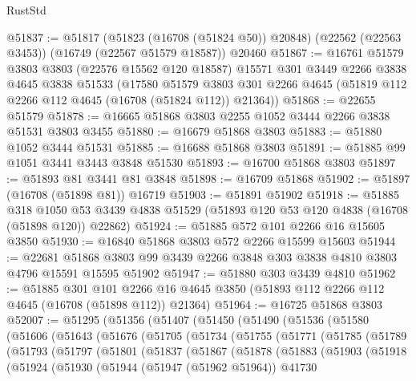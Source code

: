 \begin{lexlean}{RustStd}
\begin{coremodule}
@51837 := @51817
    (@51823 (@16708 (@51824 @50)) @20848)
    (@22562 (@22563 @3453))
    (@16749 (@22567 @51579 @18587))
    @20460
@51867 := @16761
    @51579
    @3803
    @3803
    (@22576 @15562 @120 @18587)
    @15571
    @301
    @3449
    @2266
    @3838
    @4645
    @3838
    @51533
    (@17580
      @51579
      @3803
      @301
      @2266
      @4645
      (@51819 @112 @2266 @112 @4645 (@16708 (@51824 @112)) @21364))
@51868 := @22655 @51579
@51878 := @16665 @51868 @3803 @2255 @1052 @3444 @2266 @3838 @51531 @3803 @3455
@51880 := @16679 @51868 @3803
@51883 := @51880 @1052 @3444 @51531
@51885 := @16688 @51868 @3803
@51891 := @51885 @99 @1051 @3441 @3443 @3848 @51530
@51893 := @16700 @51868 @3803
@51897 := @51893 @81 @3441 @81 @3848
@51898 := @16709 @51868
@51902 := @51897 (@16708 (@51898 @81)) @16719
@51903 := @51891 @51902
@51918 := @51885
    @318
    @1050
    @53
    @3439
    @4838
    @51529
    (@51893 @120 @53 @120 @4838 (@16708 (@51898 @120)) @22862)
@51924 := @51885 @572 @101 @2266 @16 @15605 @3850
@51930 := @16840 @51868 @3803 @572 @2266 @15599 @15603
@51944 := @22681
    @51868
    @3803
    @99
    @3439
    @2266
    @3848
    @303
    @3838
    @4810
    @3803
    @4796
    @15591
    @15595
    @51902
@51947 := @51880 @303 @3439 @4810
@51962 := @51885
    @301
    @101
    @2266
    @16
    @4645
    @3850
    (@51893 @112 @2266 @112 @4645 (@16708 (@51898 @112)) @21364)
@51964 := @16725 @51868 @3803
@52007 := @51295
    (@51356
      (@51407
        (@51450
          (@51490
            (@51536
              (@51580
                (@51606
                  (@51643
                    (@51676
                      (@51705
                        (@51734
                          (@51755
                            (@51771
                              (@51785
                                (@51789
                                  (@51793
                                    (@51797
                                      (@51801
                                        (@51837
                                          (@51867
                                            (@51878
                                              (@51883
                                                (@51903
                                                  (@51918
                                                    (@51924
                                                      (@51930
                                                        (@51944
                                                          (@51947 (@51962 @51964))
                                                          @41730

\end{coremodule}
\end{lexlean}
